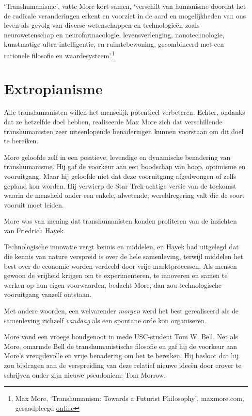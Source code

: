 \documentclass[
  a5paper,
  smalldemyvopaper,11pt,twoside,onecolumn,openright,extrafontsizes]{memoir}
\begin{document}
`Transhumanisme', vatte More kort samen, `verschilt van humanisme
doordat het de radicale veranderingen erkent en voorziet in de aard en
mogelijkheden van ons leven als gevolg van diverse wetenschappen en
technologieën zoals neurowetenschap en neurofarmacologie,
levensverlenging, nanotechnologie, kunstmatige ultra-intelligentie, en
ruimtebewoning, gecombineerd met een rationele filosofie en
waardesysteem'.\footnote{Max More, `Transhumanism: Towards a Futurist
  Philosophy', maxmore.com, geraadpleegd
  \href{https://web.archive.org/web/20051029125153/http://www.maxmore.com/transhum.htm}{online}}

\section{Extropianisme}\label{extropianisme}

Alle transhumanisten willen het menselijk potentieel verbeteren. Echter,
ondanks dat ze hetzelfde doel hebben, realiseerde Max More zich dat
verschillende transhumanisten zeer uiteenlopende benaderingen kunnen
voorstaan om dit doel te bereiken.

More geloofde zelf in een positieve, levendige en dynamische benadering
van transhumanisme. Hij gaf de voorkeur aan een boodschap van hoop,
optimisme en vooruitgang. Maar hij geloofde niet dat deze vooruitgang
afgedwongen of zelfs gepland kon worden. Hij verwierp de Star
Trek-achtige versie van de toekomst waarin de mensheid onder een enkele,
alwetende, wereldregering valt die de soort vooruit moet leiden.

More was van mening dat transhumanisten konden profiteren van de
inzichten van Friedrich Hayek.

Technologische innovatie vergt kennis en middelen, en Hayek had
uitgelegd dat die kennis van nature verspreid is over de hele
samenleving, terwijl middelen het best over de economie worden verdeeld
door vrije marktprocessen. Als mensen gewoon de vrijheid krijgen om te
experimenteren, te innoveren en samen te werken op hun eigen
voorwaarden, bedacht More, dan zou technologische vooruitgang vanzelf
ontstaan.

Met andere woorden, een welvarender \emph{morgen} werd het best
gerealiseerd als de samenleving zichzelf \emph{vandaag} als een spontane
orde kon organiseren.

More vond een vroege bondgenoot in mede USC-student Tom W. Bell. Net als
More, omarmde Bell de transhumanistische filosofie en gaf hij de
voorkeur aan More's vreugdevolle en vrije benadering om het te bereiken.
Hij besloot dat hij zou bijdragen aan de verspreiding van deze relatief
nieuwe ideeën door erover te schrijven onder zijn nieuwe pseudoniem: Tom
Morrow.
\end{document}
